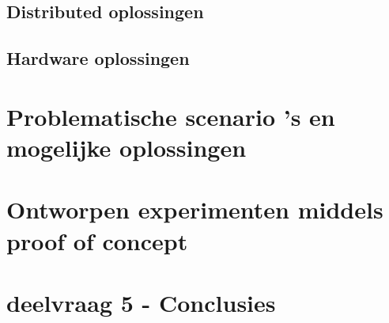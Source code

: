 \subsection{Distributed oplossingen}
\label{sec:distributed}

\clearpage

\subsection{Hardware oplossingen}
\label{sec:hardware}

\clearpage

\section{Problematische scenario 's en mogelijke oplossingen}
\label{sec:deelvraag3}

\clearpage


\section{Ontworpen experimenten middels proof of concept}
\label{sec:deelvraag4}

\clearpage

\section{deelvraag 5 - Conclusies}
\label{sec:deelvraag5}

